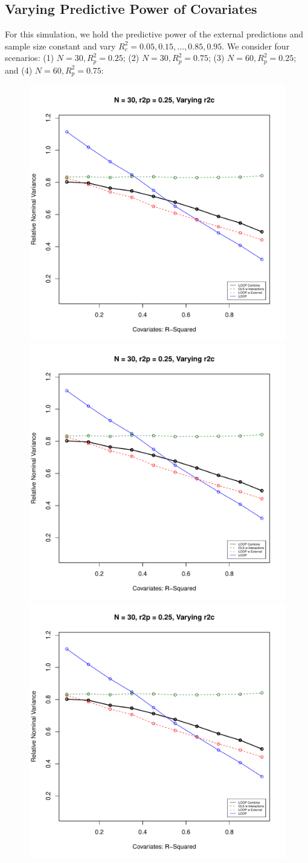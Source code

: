\subsection{Varying Predictive Power of Covariates}
For this simulation, we hold the predictive power of the external predictions and sample size constant and vary $R^2_c = 0.05, 0.15, ..., 0.85, 0.95$. We consider four scenarios: (1) $N = 30, R^2_p = 0.25$; (2) $N = 30, R^2_p = 0.75$; (3) $N = 60, R^2_p = 0.25$; and (4) $N = 60, R^2_p = 0.75$:
\begin{figure}[H]
	\centering
	\includegraphics[width=.49\linewidth]{images/r2c.pdf}
	\includegraphics[width=.49\linewidth,page = 2]{images/r2c.pdf} \quad
	\smallskip
	\includegraphics[width=.49\linewidth,page = 3]{images/r2c.pdf}

\end{figure}
